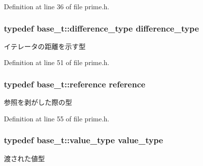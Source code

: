 \-Definition at line 36 of file prime.\-h.

\hypertarget{classyuh_1_1range__detail_1_1prime__iterator_a9ac6039762e1b262cecb98589ffc1d75}{
\subsubsection[{difference\-\_\-type}]{\setlength{\rightskip}{0pt plus 5cm}typedef base\-\_\-t\-::difference\-\_\-type {\bf difference\-\_\-type}}}\label{d9/dc8/classyuh_1_1range__detail_1_1prime__iterator_a9ac6039762e1b262cecb98589ffc1d75}
イテレータの距離を示す型 

\-Definition at line 51 of file prime.\-h.

\hypertarget{classyuh_1_1range__detail_1_1prime__iterator_aa5d67140d1557795cc6c30a2849d4e05}{
\subsubsection[{reference}]{\setlength{\rightskip}{0pt plus 5cm}typedef base\-\_\-t\-::reference {\bf reference}}}\label{d9/dc8/classyuh_1_1range__detail_1_1prime__iterator_aa5d67140d1557795cc6c30a2849d4e05}
参照を剥がした際の型 

\-Definition at line 55 of file prime.\-h.

\hypertarget{classyuh_1_1range__detail_1_1prime__iterator_ab7468d4ed49b58c84d6c1b71779fb43e}{
\subsubsection[{value\-\_\-type}]{\setlength{\rightskip}{0pt plus 5cm}typedef base\-\_\-t\-::value\-\_\-type {\bf value\-\_\-type}}}\label{d9/dc8/classyuh_1_1range__detail_1_1prime__iterator_ab7468d4ed49b58c84d6c1b71779fb43e}
渡された値型 

